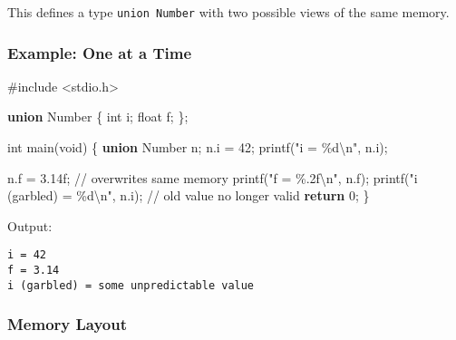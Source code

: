 \documentclass[
  letterpaper,
  DIV=11,
  numbers=noendperiod]{scrreprt}
\newenvironment{Shaded}{\begin{snugshade}}{\end{snugshade}}
\newcommand{\BuiltInTok}[1]{\textcolor[rgb]{0.00,0.23,0.31}{#1}}
\newcommand{\CommentTok}[1]{\textcolor[rgb]{0.37,0.37,0.37}{#1}}
\newcommand{\ControlFlowTok}[1]{\textcolor[rgb]{0.00,0.23,0.31}{\textbf{#1}}}
\newcommand{\DataTypeTok}[1]{\textcolor[rgb]{0.68,0.00,0.00}{#1}}
\newcommand{\DecValTok}[1]{\textcolor[rgb]{0.68,0.00,0.00}{#1}}
\newcommand{\FloatTok}[1]{\textcolor[rgb]{0.68,0.00,0.00}{#1}}
\newcommand{\ImportTok}[1]{\textcolor[rgb]{0.00,0.46,0.62}{#1}}
\newcommand{\KeywordTok}[1]{\textcolor[rgb]{0.00,0.23,0.31}{\textbf{#1}}}
\newcommand{\NormalTok}[1]{\textcolor[rgb]{0.00,0.23,0.31}{#1}}
\newcommand{\OperatorTok}[1]{\textcolor[rgb]{0.37,0.37,0.37}{#1}}
\newcommand{\PreprocessorTok}[1]{\textcolor[rgb]{0.68,0.00,0.00}{#1}}
\newcommand{\SpecialCharTok}[1]{\textcolor[rgb]{0.37,0.37,0.37}{#1}}
\newcommand{\StringTok}[1]{\textcolor[rgb]{0.13,0.47,0.30}{#1}}
\begin{document}
This defines a type \texttt{union\ Number} with two possible views of
the same memory.

\subsubsection{Example: One at a Time}\label{example-one-at-a-time}

\begin{Shaded}
\begin{Highlighting}[]
\PreprocessorTok{\#include }\ImportTok{\textless{}stdio.h\textgreater{}}

\KeywordTok{union}\NormalTok{ Number }\OperatorTok{\{}
    \DataTypeTok{int}\NormalTok{ i}\OperatorTok{;}
    \DataTypeTok{float}\NormalTok{ f}\OperatorTok{;}
\OperatorTok{\};}

\DataTypeTok{int}\NormalTok{ main}\OperatorTok{(}\DataTypeTok{void}\OperatorTok{)} \OperatorTok{\{}
    \KeywordTok{union}\NormalTok{ Number n}\OperatorTok{;}
\NormalTok{    n}\OperatorTok{.}\NormalTok{i }\OperatorTok{=} \DecValTok{42}\OperatorTok{;}
\NormalTok{    printf}\OperatorTok{(}\StringTok{"i = }\SpecialCharTok{\%d\textbackslash{}n}\StringTok{"}\OperatorTok{,}\NormalTok{ n}\OperatorTok{.}\NormalTok{i}\OperatorTok{);}

\NormalTok{    n}\OperatorTok{.}\NormalTok{f }\OperatorTok{=} \FloatTok{3.14}\BuiltInTok{f}\OperatorTok{;}          \CommentTok{// overwrites same memory}
\NormalTok{    printf}\OperatorTok{(}\StringTok{"f = }\SpecialCharTok{\%.2f\textbackslash{}n}\StringTok{"}\OperatorTok{,}\NormalTok{ n}\OperatorTok{.}\NormalTok{f}\OperatorTok{);}
\NormalTok{    printf}\OperatorTok{(}\StringTok{"i (garbled) = }\SpecialCharTok{\%d\textbackslash{}n}\StringTok{"}\OperatorTok{,}\NormalTok{ n}\OperatorTok{.}\NormalTok{i}\OperatorTok{);} \CommentTok{// old value no longer valid}
    \ControlFlowTok{return} \DecValTok{0}\OperatorTok{;}
\OperatorTok{\}}
\end{Highlighting}
\end{Shaded}

Output:

\begin{verbatim}
i = 42
f = 3.14
i (garbled) = some unpredictable value
\end{verbatim}

\subsubsection{Memory Layout}\label{memory-layout}
\end{document}
